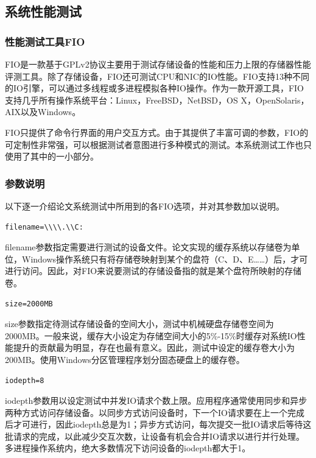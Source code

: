 \subsection{系统性能测试}

\subsubsection{性能测试工具FIO}
FIO是一款基于GPLv2协议主要用于测试存储设备的性能和压力上限的存储器性能评测工具。除了存储设备，FIO还可测试CPU和NIC的IO性能。FIO支持13种不同的IO引擎，可以通过多线程或多进程模拟各种IO操作。作为一款开源工具，FIO支持几乎所有操作系统平台：Linux，FreeBSD，NetBSD，OS X，OpenSolaris，AIX以及Windows。

FIO只提供了命令行界面的用户交互方式。由于其提供了丰富可调的参数，FIO的可定制性非常强，可以根据测试者意图进行多种模式的测试。本系统测试工作也只使用了其中的一小部分。

\subsubsection{参数说明}

以下逐一介绍论文系统测试中所用到的各FIO选项，并对其参数加以说明。

\begin{lstlisting}
filename=\\\\.\\C:
\end{lstlisting}

filename参数指定需要进行测试的设备文件。论文实现的缓存系统以存储卷为单位，Windows操作系统只有将存储卷映射到某个的盘符（C、D、E……）后，才可进行访问。因此，对FIO来说要测试的存储设备指的就是某个盘符所映射的存储卷。

\begin{lstlisting}
size=2000MB
\end{lstlisting}

size参数指定待测试存储设备的空间大小，测试中机械硬盘存储卷空间为2000MB。一般来说，缓存大小设定为存储空间大小的5\%-15\%时缓存对系统IO性能提升的贡献最为明显，存在也最有意义。因此，测试中设定的缓存卷大小为200MB。使用Windows分区管理程序划分固态硬盘上的缓存卷。

\begin{lstlisting}
iodepth=8
\end{lstlisting}

iodepth参数用以设定测试中并发IO请求个数上限。应用程序通常使用同步和异步两种方式访问存储设备。以同步方式访问设备时，下一个IO请求要在上一个完成后才可进行，因此iodepth总是为1；异步方式访问，每次提交一批IO请求后等待这批请求的完成，以此减少交互次数，让设备有机会合并IO请求以进行并行处理。多进程操作系统内，绝大多数情况下访问设备的iodepth都大于1。

